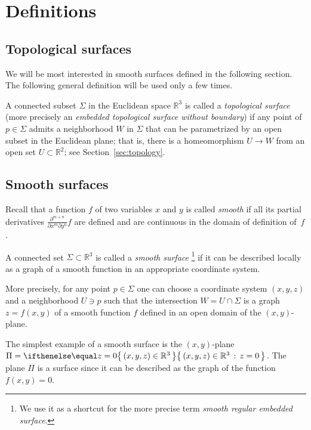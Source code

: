\chapter{Definitions}
\label{chap:surfaces-def}

\section{Topological surfaces}

We will be most interested in smooth surfaces defined in the following section.
The following general definition will be used only a few times.

A connected subset $\Sigma$ in the Euclidean space $\mathbb{R}^3$
is called a \emph{topological surface} (more precisely an {}\emph{embedded topological surface without boundary}) 
if any point of $p\in \Sigma$ admits a neighborhood $W$ in $\Sigma$ 
that can be parametrized by an open subset in the Euclidean plane; 
that is, there is a homeomorphism $U\to W$ from an open set $U\subset \mathbb{R}^2$; see Section~\ref{sec:topology}.


\section{Smooth surfaces}\label{sec:def-smooth-surface}

Recall that a function $f$ of two variables $x$ and $y$ is called \emph{smooth} if all its partial derivatives $\frac{\partial^{m+n}}{\partial x^m\partial y^n}f$ are defined and are continuous in the domain of definition of~$f$. 

A connected set $\Sigma \subset \mathbb{R}^3$ is called a \emph{smooth surface}%
\footnote{We use it as a shortcut for the more precise term {}\emph{smooth regular embedded surface}.} if it can be described locally as a graph of a smooth function in an appropriate coordinate system.

More precisely, for any point $p\in \Sigma$ one can choose a coordinate system $(x,y,z)$ and a neighborhood $U\ni p$ such that
the intersection $W=U\cap \Sigma$ is a graph $z=f(x,y)$ of a smooth function $f$ defined in an open domain of the $(x,y)$-plane.

The simplest example of a smooth surface is the $(x,y)$-plane 
$\Pi=\set{(x,y,z)\in\mathbb{R}^3}{z=0}$.
The plane $\Pi$ is a surface since
it can be described as the graph of the function $f(x,y)=0$.

